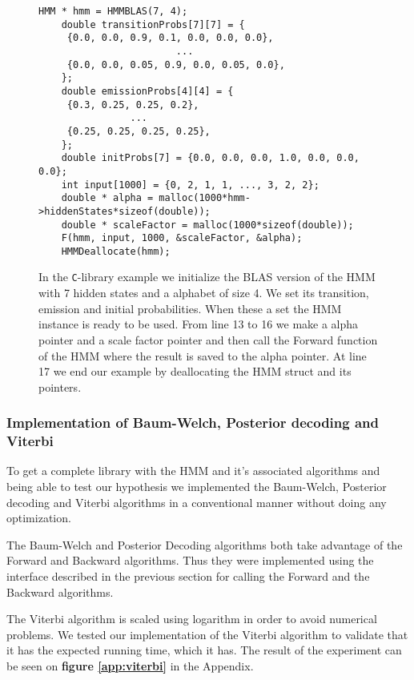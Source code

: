 \begin{figure}[H]
    \centering
    \begin{lstlisting}[style=CStyle]
    HMM * hmm = HMMBLAS(7, 4);
    double transitionProbs[7][7] = {
     {0.0, 0.0, 0.9, 0.1, 0.0, 0.0, 0.0},
                        ...
     {0.0, 0.0, 0.05, 0.9, 0.0, 0.05, 0.0},
    };
    double emissionProbs[4][4] = {
     {0.3, 0.25, 0.25, 0.2},
                ...
     {0.25, 0.25, 0.25, 0.25},
    };
    double initProbs[7] = {0.0, 0.0, 0.0, 1.0, 0.0, 0.0, 0.0};
    int input[1000] = {0, 2, 1, 1, ..., 3, 2, 2};
    double * alpha = malloc(1000*hmm->hiddenStates*sizeof(double));
    double * scaleFactor = malloc(1000*sizeof(double));
    F(hmm, input, 1000, &scaleFactor, &alpha);
    HMMDeallocate(hmm);\end{lstlisting}
    \caption{In the \texttt{C}-library example we initialize the BLAS version of the HMM with 7 hidden states and a alphabet of size 4. We set its transition, emission and initial probabilities. When these a set the HMM instance is ready to be used. From line 13 to 16 we make a alpha pointer and a scale factor pointer and then call the Forward function of the HMM where the result is saved to the alpha pointer. At line 17 we end our example by  deallocating the HMM struct and its pointers.}
    \label{fig:c_example}
\end{figure}


\subsubsection{Implementation of Baum-Welch, Posterior decoding and Viterbi}

To get a complete library with the HMM and it's associated algorithms and being able to test our hypothesis we implemented the Baum-Welch, Posterior decoding and Viterbi algorithms in a conventional manner without doing any optimization.

The Baum-Welch and Posterior Decoding algorithms both take advantage of the Forward and Backward algorithms. Thus they were implemented using the interface described in the previous section for calling the Forward and the Backward algorithms.

The Viterbi algorithm is scaled using logarithm in order to avoid numerical problems. We tested our implementation of the Viterbi algorithm to validate that it has the expected running time, which it has. The result of the experiment can be seen on \textbf{figure \ref{app:viterbi}} in the Appendix. 

